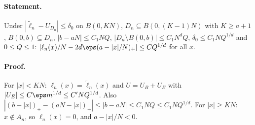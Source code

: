 \paragraph{Statement.} Under $|\widetilde\ell_n-U_{D_n}|\leq\delta_0$ on $B(0,KN)$, $D_n\subseteq B(0,(K-1)N)$ with $K\geq a+1$, $B(0,b)\subseteq D_n$, $|b-aN|\leq C_1NQ$,
$|D_n\setminus B(0,b)|\leq C_1N^dQ$, $\delta_0\leq C_1NQ^{1/d}$ and $0\leq Q\leq1$: $|\ell_n(x)/N-2d\eps(a-|x|/N)_+|\leq CQ^{1/d}$ for all $x$.
\paragraph{Proof.} For $|x|<KN$: $\ell_n(x)=\widetilde\ell_n(x)$ and $U=U_B+U_E$ with $|U_E|\leq C\eps m^{1/d}\leq C'NQ^{1/d}$. Also
$|(b-|x|)_+-(aN-|x|)_+|\leq|b-aN|\leq C_1NQ\leq C_1NQ^{1/d}$. For $|x|\geq KN$: $x\notin A_n$, so $\ell_n(x)=0$, and $a-|x|/N<0$.
